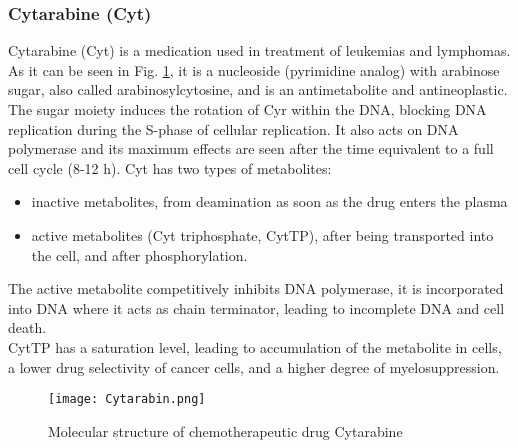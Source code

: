 \subsubsection{Cytarabine (Cyt)}
Cytarabine (Cyt) is a medication used in treatment of leukemias and lymphomas. As it can be seen in Fig. \ref{fig:Cyt}, it is a nucleoside (pyrimidine analog) with arabinose sugar, also called arabinosylcytosine, and is an antimetabolite and antineoplastic.
The sugar moiety induces the rotation of Cyr within the DNA, blocking DNA replication during the S-phase of cellular replication. It also acts on DNA polymerase and its maximum effects are seen after the time equivalent to a full cell cycle (8-12 h).
Cyt has two types of metabolites: 
\begin{itemize}
	\item inactive metabolites, from deamination as soon as the drug enters the plasma
	\item active metabolites (Cyt triphosphate, CytTP), after being transported into the cell, and after phosphorylation.
\end{itemize}
The active metabolite competitively inhibits DNA polymerase, it is incorporated into DNA where it acts as chain terminator, leading to incomplete DNA and cell death.\\
CytTP has a saturation level, leading to accumulation of the metabolite in cells, a lower drug selectivity of cancer cells, and a higher degree of myelosuppression.\cite{cyt-1, cyt-2}
\begin{figure}[htbp!]
	\centering
	\texttt{[image: Cytarabin.png]}
	\caption{Molecular structure of chemotherapeutic drug Cytarabine}
	\label{fig:Cyt}
\end{figure}

